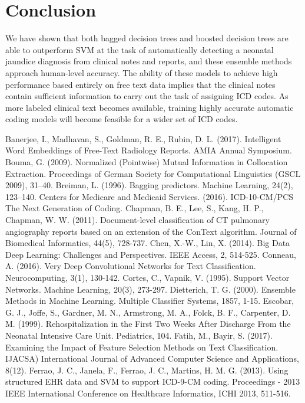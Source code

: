 \documentclass[conference]{IEEEtran}
\begin{document}
\section{Conclusion}
We have shown that both bagged decision trees and boosted decision trees are able to outperform SVM at the task of automatically detecting a neonatal jaundice diagnosis from clinical notes and reports, and these ensemble methods approach human-level accuracy. The ability of these models to achieve high performance based entirely on free text data implies that the clinical notes contain sufficient information to carry out the task of assigning ICD codes. As more labeled clinical text becomes available, training highly accurate automatic coding models will become feasible for a wider set of ICD codes. 

\begin{thebibliography}{00}
 Banerjee, I., Madhavan, S., Goldman, R. E., Rubin, D. L. (2017). Intelligent Word Embeddings of Free-Text Radiology Reports. AMIA Annual Symposium.
 Bouma, G. (2009). Normalized (Pointwise) Mutual Information in Collocation Extraction. Proceedings of German Society for Computational Linguistics (GSCL 2009), 31–40.
 Breiman, L. (1996). Bagging predictors. Machine Learning, 24(2), 123–140.
Centers for Medicare and Medicaid Services. (2016). ICD-10-CM/PCS The Next Generation of Coding.
 Chapman, B. E., Lee, S., Kang, H. P., Chapman, W. W. (2011). Document-level classification of CT pulmonary angiography reports based on an extension of the ConText algorithm. Journal of Biomedical Informatics, 44(5), 728-737.
 Chen, X.-W., Lin, X. (2014). Big Data Deep Learning: Challenges and Perspectives. IEEE Access, 2, 514-525.
 Conneau, A. (2016). Very Deep Convolutional Networks for Text Classification. Neurocomputing, 3(1), 130-142.
 Cortes, C., Vapnik, V. (1995). Support Vector Networks. Machine Learning, 20(3), 273-297.
 Dietterich, T. G. (2000). Ensemble Methods in Machine Learning. Multiple Classifier Systems, 1857, 1-15.
 Escobar, G. J., Joffe, S., Gardner, M. N., Armstrong, M. A., Folck, B. F., Carpenter, D. M. (1999). Rehospitalization in the First Two Weeks After Discharge From the Neonatal Intensive Care Unit. Pediatrics, 104.
 Fatih, M., Bayir, S. (2017). Examining the Impact of Feature Selection Methods on Text Classification. IJACSA) International Journal of Advanced Computer Science and Applications, 8(12).
 Ferrao, J. C., Janela, F., Ferrao, J. C., Martins, H. M. G. (2013). Using structured EHR data and SVM to support ICD-9-CM coding. Proceedings - 2013 IEEE International Conference on Healthcare Informatics, ICHI 2013, 511-516.

\end{thebibliography}
\end{document}
